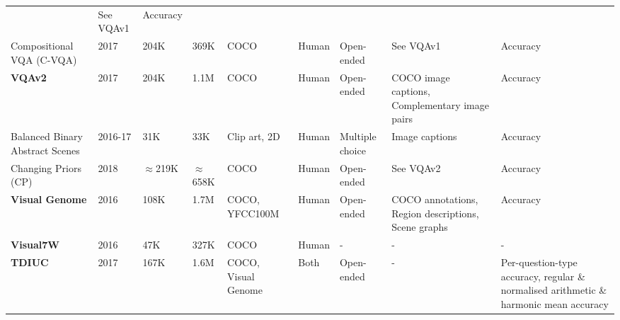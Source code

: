 \begin{landscape}
\begin{center}
\begin{xltabular}{\linewidth}{LLLLLLLLL}
      & See VQAv1
      & Accuracy\footnotemark[\value{footnote}] \\
      Compositional VQA (C-VQA) \cite{agrawal2017cvqa}
      & 2017
      & 204K  %
      & 369K  %
      & COCO
      & Human
      & Open-ended
      & See VQAv1
      & Accuracy\footnotemark[\value{footnote}] \\
      \textbf{VQAv2} \cite{goyal2017making}
      & 2017
      & 204K  %
      & 1.1M  %
      & COCO
      & Human
      & Open-ended
      & COCO image captions, Complementary image pairs
      & Accuracy\footnotemark[\value{footnote}] \\
      Balanced Binary Abstract Scenes \cite{zhang2016yin}
      & 2016-17
      & 31K %
      & 33K %
      & Clip art, 2D
      & Human
      & Multiple choice
      & Image captions
      & Accuracy\footnotemark[\value{footnote}] \\
      Changing Priors (CP) \cite{agrawal2018dont}
      & 2018
      & {\color{red}\(\approx\)219K}  %
      & {\color{red}\(\approx\)658K}  %
      & COCO
      & Human
      & Open-ended
      & See VQAv2
      & Accuracy\footnotemark[\value{footnote}] \\
      \textbf{Visual Genome} \cite{krishna2017visual}
      & 2016
      & 108K  %
      & 1.7M  %
      & COCO, YFCC100M \cite{thomee2016yfcc100m}
      & Human
      & Open-ended
      & COCO annotations, Region descriptions, Scene graphs
      & Accuracy \\
      \textbf{Visual7W} \cite{zhu2016visual7w}
      & 2016
      & 47K %
      & 327K %
      & COCO
      & Human
      & -
      & - %
      & - \\
      \textbf{TDIUC} \cite{kafle2017analysis}
      & 2017
      & 167K %
      & 1.6M %
      & COCO, Visual Genome
      & Both
      & Open-ended
      & -
      & Per-question-type accuracy, regular \& normalised arithmetic \& harmonic mean accuracy\\

\end{xltabular}
\end{center}
\end{landscape}
